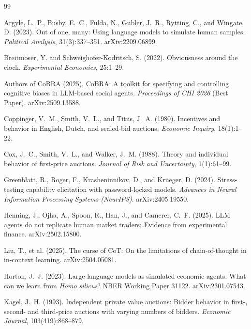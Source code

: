 \begin{thebibliography}{99}

Argyle, L.~P., Busby, E.~C., Fulda, N., Gubler, J.~R., Rytting, C.,
and Wingate, D. (2023).
Out of one, many: Using language models to simulate human samples.
\emph{Political Analysis}, 31(3):337--351. arXiv:2209.06899.

Breitmoser, Y. and Schweighofer-Kodritsch, S. (2022).
Obviousness around the clock.
\emph{Experimental Economics}, 25:1--29.

Authors of CoBRA (2025).
CoBRA: A toolkit for specifying and controlling cognitive biases in
LLM-based social agents.
\emph{Proceedings of CHI 2026} (Best Paper). arXiv:2509.13588.

Coppinger, V.~M., Smith, V.~L., and Titus, J.~A. (1980).
Incentives and behavior in English, Dutch, and sealed-bid auctions.
\emph{Economic Inquiry}, 18(1):1--22.

Cox, J.~C., Smith, V.~L., and Walker, J.~M. (1988).
Theory and individual behavior of first-price auctions.
\emph{Journal of Risk and Uncertainty}, 1(1):61--99.

Greenblatt, R., Roger, F., Krasheninnikov, D., and Krueger, D. (2024).
Stress-testing capability elicitation with password-locked models.
\emph{Advances in Neural Information Processing Systems (NeurIPS)}.
arXiv:2405.19550.

Henning, J., Ojha, A., Spoon, R., Han, J., and Camerer, C.~F. (2025).
LLM agents do not replicate human market traders: Evidence from
experimental finance.
arXiv:2502.15800.

Liu, T., et al. (2025).
The curse of CoT: On the limitations of chain-of-thought in in-context
learning.
arXiv:2504.05081.

Horton, J.~J. (2023).
Large language models as simulated economic agents: What can we
learn from \emph{Homo silicus}?
NBER Working Paper 31122. arXiv:2301.07543.

Kagel, J.~H. (1993).
Independent private value auctions: Bidder behavior in first-,
second- and third-price auctions with varying numbers of bidders.
\emph{Economic Journal}, 103(419):868--879.


\end{thebibliography}
